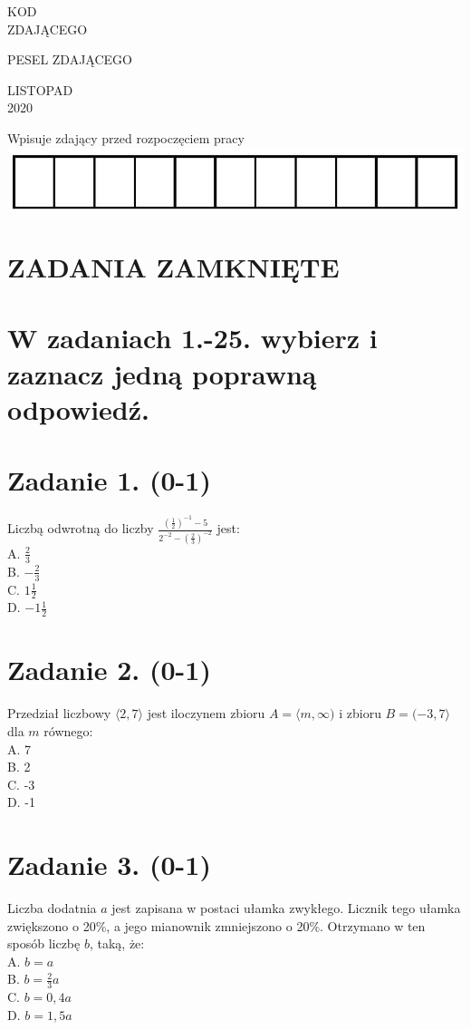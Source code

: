 \documentclass[10pt]{article}
\begin{document}
KOD\\
ZDAJĄCEGO

PESEL ZDAJĄCEGO

LISTOPAD\\
2020

Wpisuje zdający przed rozpoczęciem pracy\\
\includegraphics[max width=\textwidth, center]{2024_11_21_6574e892c2387ce90f12g-01}

\section*{ZADANIA ZAMKNIĘTE}
\section*{W zadaniach 1.-25. wybierz i zaznacz jedną poprawną odpowiedź.}
\section*{Zadanie 1. (0-1)}
Liczbą odwrotną do liczby \(\frac{\left(\frac{1}{2}\right)^{-1}-5}{2^{-2}-\left(\frac{2}{3}\right)^{-2}}\) jest:\\
A. \(\frac{2}{3}\)\\
B. \(-\frac{2}{3}\)\\
C. \(1 \frac{1}{2}\)\\
D. \(-1 \frac{1}{2}\)

\section*{Zadanie 2. (0-1)}
Przedział liczbowy \(\langle 2,7\rangle\) jest iloczynem zbioru \(A=\langle m, \infty)\) i zbioru \(B=(-3,7\rangle\) dla \(m\) równego:\\
A. 7\\
B. 2\\
C. -3\\
D. -1

\section*{Zadanie 3. (0-1)}
Liczba dodatnia \(a\) jest zapisana w postaci ułamka zwykłego. Licznik tego ułamka zwiększono o 20\%, a jego mianownik zmniejszono o 20\%. Otrzymano w ten sposób liczbę \(b\), taką, że:\\
A. \(b=a\)\\
B. \(b=\frac{2}{3} a\)\\
C. \(b=0,4 a\)\\
D. \(b=1,5 a\)
\end{document}
